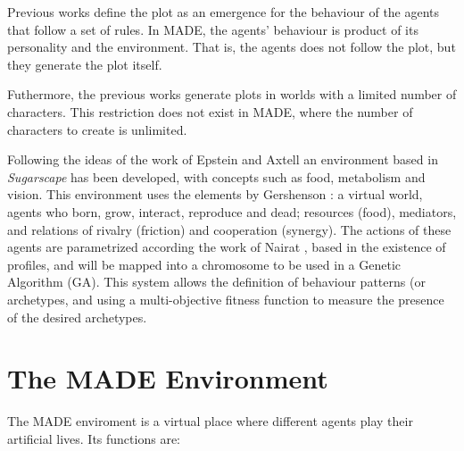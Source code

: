 \documentclass[runningheads]{llncs}
\begin{document}

Previous works define the plot as an emergence for the behaviour of the agents that follow a set of rules. In MADE, the agents' behaviour is product of its personality and the environment. That is, the agents does not follow the plot, but they generate the plot itself. 


Futhermore, the previous works generate plots in worlds with a limited number of characters. This restriction does not exist in MADE, where the number of characters to create is unlimited.


Following the ideas of the work of Epstein and Axtell
\cite{epstein1996growing} an environment based in {\em Sugarscape} has
been developed, with concepts such as food, metabolism and
vision. This environment uses the elements  by Gershenson %
\cite{gershenson2005general}: a virtual world, agents who born, grow,
interact, reproduce and dead; resources (food), mediators, and
relations of rivalry (friction) and cooperation (synergy). The actions
of these agents are parametrized according the work of Nairat
\cite{nairat2011character}, based in the existence of profiles, and
will be mapped into a chromosome to be used in a Genetic Algorithm
(GA). This system allows the definition of behaviour patterns (or
archetypes, and using a multi-objective fitness function to measure
the presence of the desired archetypes. %




\section{The MADE Environment}
\label{sec:made}

The MADE enviroment is a virtual place where different agents play their artificial lives. Its functions are:
\end{document}
